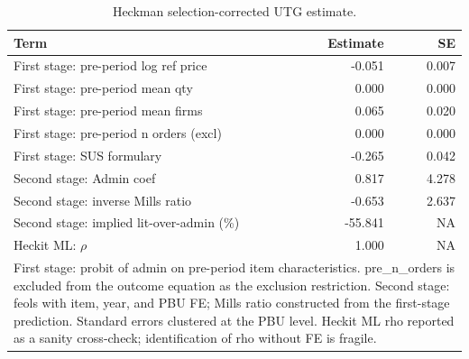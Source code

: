 \begin{table}

\caption{\label{tab:utg_heckman}Heckman selection-corrected UTG estimate.}
\centering
\begin{tabular}[t]{lrr}
\toprule
Term & Estimate & SE\\
\midrule
First stage: pre-period log ref price & -0.051 & 0.007\\
First stage: pre-period mean qty & 0.000 & 0.000\\
First stage: pre-period mean firms & 0.065 & 0.020\\
First stage: pre-period n orders (excl) & 0.000 & 0.000\\
First stage: SUS formulary & -0.265 & 0.042\\
\addlinespace
Second stage: Admin coef & 0.817 & 4.278\\
Second stage: inverse Mills ratio & -0.653 & 2.637\\
Second stage: implied lit-over-admin (\%) & -55.841 & NA\\
Heckit ML: $\rho$ & 1.000 & NA\\
\bottomrule
\multicolumn{3}{l}{\rule{0pt}{1em}First stage: probit of admin on pre-period item characteristics. pre\_n\_orders is excluded from the outcome equation as the exclusion restriction. Second stage: feols with item, year, and PBU FE; Mills ratio constructed from the first-stage prediction. Standard errors clustered at the PBU level. Heckit ML rho reported as a sanity cross-check; identification of rho without FE is fragile.}\\
\end{tabular}
\end{table}
